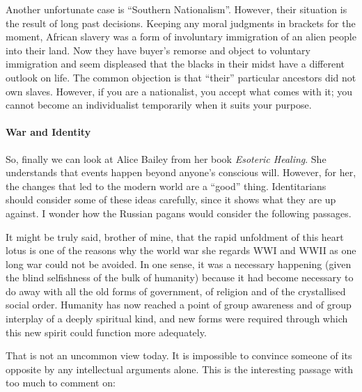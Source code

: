 Another unfortunate case is ``Southern Nationalism''. However, their situation is the result of long past decisions. Keeping any moral judgments in brackets for the moment, African slavery was a form of involuntary immigration of an alien people into their land. Now they have buyer's remorse and object to voluntary immigration and seem displeased that the blacks in their midst have a different outlook on life. The common objection is that ``their'' particular ancestors did not own slaves. However, if you are a nationalist, you accept what comes with it; you cannot become an individualist temporarily when it suits your purpose.

\paragraph{War and Identity}


So, finally we can look at Alice Bailey from her book \textit{Esoteric Healing}. She understands that events happen beyond anyone's conscious will. However, for her, the changes that led to the modern world are a ``good'' thing. Identitarians should consider some of these ideas carefully, since it shows what they are up against. I wonder how the Russian pagans would consider the following passages.

\begin{quotex}
It might be truly said, brother of mine, that the rapid unfoldment of this heart lotus is one of the reasons why the world war she regards WWI and WWII as one long war could not be avoided. In one sense, it was a necessary happening (given the blind selfishness of the bulk of humanity) because it had become necessary to do away with all the old forms of government, of religion and of the crystallised social order. Humanity has now reached a point of group awareness and of group interplay of a deeply spiritual kind, and new forms were required through which this new spirit could function more adequately.
\end{quotex}


That is not an uncommon view today. It is impossible to convince someone of its opposite by any intellectual arguments alone. This is the interesting passage with too much to comment on:

